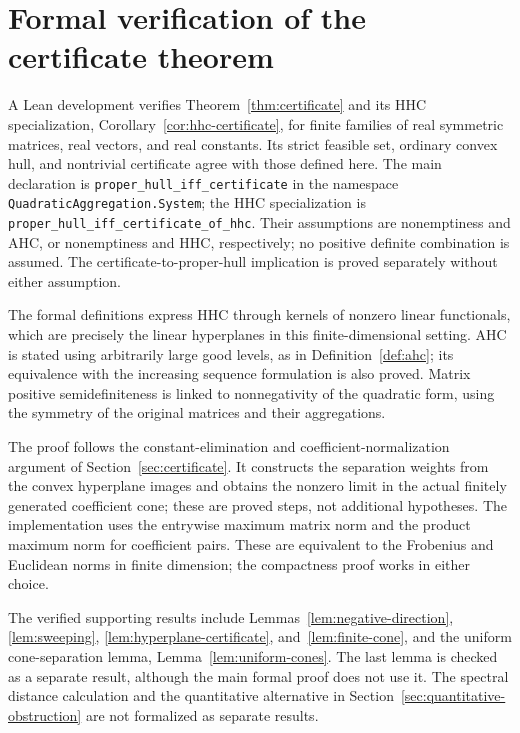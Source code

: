 \section{Formal verification of the certificate theorem}
\label{sec:formal-verification}

A Lean development verifies Theorem~\ref{thm:certificate} and its HHC
specialization, Corollary~\ref{cor:hhc-certificate}, for finite families
of real symmetric matrices, real vectors, and real constants. Its strict
feasible set, ordinary convex hull, and nontrivial certificate agree with
those defined here. The main declaration is
\texttt{proper\_hull\_iff\_certificate} in the namespace
\texttt{QuadraticAggregation.System}; the HHC specialization is
\texttt{proper\_hull\_iff\_certificate\_of\_hhc}.
Their assumptions are nonemptiness and AHC, or nonemptiness and HHC,
respectively; no positive definite combination is assumed. The
certificate-to-proper-hull implication is proved separately without
either assumption.

The formal definitions express HHC through kernels of nonzero linear
functionals, which are precisely the linear hyperplanes in this
finite-dimensional setting. AHC is stated using arbitrarily large good
levels, as in Definition~\ref{def:ahc}; its equivalence with the increasing
sequence formulation is also proved. Matrix positive semidefiniteness is
linked to nonnegativity of the quadratic form, using the symmetry of the
original matrices and their aggregations.

The proof follows the constant-elimination and coefficient-normalization
argument of Section~\ref{sec:certificate}. It constructs the separation
weights from the convex hyperplane images and obtains the nonzero limit
in the actual finitely generated coefficient cone; these are proved
steps, not additional hypotheses.
The implementation uses the entrywise maximum matrix norm and the
product maximum norm for coefficient pairs. These are equivalent to the
Frobenius and Euclidean norms in finite dimension; the compactness proof
works in either choice.

The verified supporting results include
Lemmas~\ref{lem:negative-direction}, \ref{lem:sweeping},
\ref{lem:hyperplane-certificate}, and~\ref{lem:finite-cone}, and the
uniform cone-separation lemma, Lemma~\ref{lem:uniform-cones}.
The last lemma is checked as a separate result, although the main
formal proof does not use it. The spectral distance calculation and the quantitative alternative
in Section~\ref{sec:quantitative-obstruction} are not formalized as
separate results.

